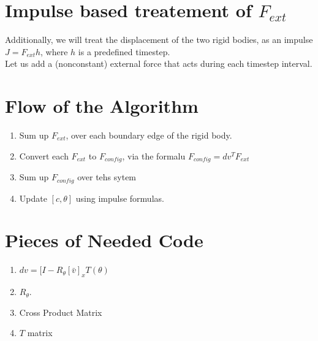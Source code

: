 \documentclass{article}
\begin{document}
\section{Impulse based treatement of $F_{ext}$}
Additionally, we will treat the displacement of the two rigid bodies, as an impulse $J = F_{ext} h$, where $h$ is a predefined timestep.\\ Let us add a (nonconstant) external force that acts during each timestep interval.\\

\newpage
\section{Flow of the Algorithm}
\begin{enumerate}
	\item Sum up $F_{ext}$, over each boundary edge of the rigid body. 
	\item Convert each $F_{ext}$ to $F_{config}$, via the formalu $F_{config} = dv^{T}F_{ext}$
	\item Sum up $F_{config}$ over tehs sytem
	\item Update $[c,\theta]$ using impulse formulas.
\end{enumerate}




\section{Pieces of Needed Code}
\begin{enumerate}
	\item $dv = [I -R_{\theta}[\bar{v}]_x T(\theta)$
	\item $R_{\theta}$.
	\item Cross Product Matrix
	\item $T$ matrix %
\end{enumerate}







	







\newpage
\end{document}
